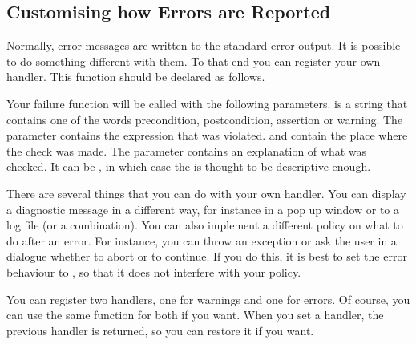 \begin{ccAdvanced}

\section{Customising how Errors are Reported}

Normally, error messages are written to the standard error output.
It is possible to do something different with them.
To that end you can register your own handler.
This function should be declared as follows.

\ccTexHtml{\begin{samepage}}{}
\renewcommand{\ccLongParamLayout}{\ccTrue}

\lcTex{\ccAutoIndexingOff}
\ccTexHtml{\end{samepage}}{}
\lcTex{\ccAutoIndexingOn}

Your failure function will be called with the following parameters.
 is a string that contains one of the words precondition,
postcondition, assertion or warning. 
The parameter  contains the expression that was violated.
 and  contain the place where the check was made.
The  parameter contains an explanation of what was 
checked. 
It can be , in which case the  is thought
to be descriptive enough.

There are several things that you can do with your own handler.
You can display a diagnostic message in a different way, for instance in 
a pop up window or to a log file (or a combination).
You can also implement a different policy on what to do after an error.
For instance, you can throw an exception or ask the user in a dialogue 
whether to abort or to continue.
If you do this, it is best to set the error behaviour to
, so that it does not interfere with your policy.

You can register two handlers, one for warnings and one for errors.
Of course, you can use the same function for both if you want.
When you set a handler, the previous handler is returned, so you can restore
it if you want.


\ccGlueBegin
{}


\end{ccAdvanced}
